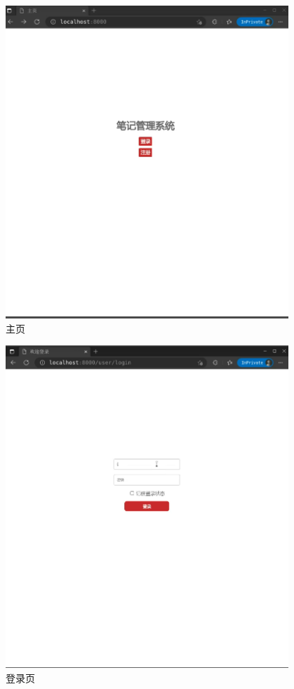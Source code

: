 \begin{figure}[H]
  \begin{center}
    \includegraphics[width=0.95\textwidth]{./figures/home_page.png}
  \end{center}
  \caption{主页}
\end{figure}

\begin{figure}[H]
  \begin{center}
    \includegraphics[width=0.95\textwidth]{./figures/login_page.png}
  \end{center}
  \caption{登录页}
\end{figure}

